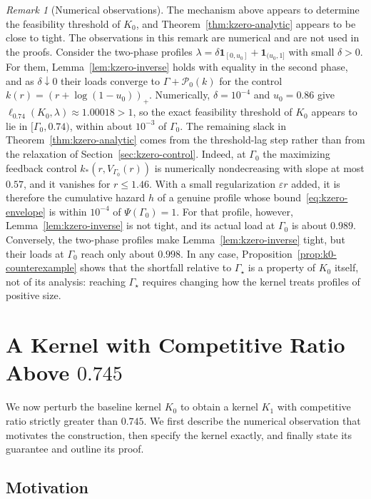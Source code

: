 \documentclass[11pt]{article}
\theoremstyle{definition}
\theoremstyle{remark}
\newtheorem*{remark}{Remark}
\newcommand{\ind}{\mathbf 1}
\newcommand{\pos}[1]{\left(#1\right)_+}
\begin{document}
\begin{remark}[Numerical observations]
The mechanism above appears to determine the feasibility threshold of $K_0$, and Theorem~\ref{thm:kzero-analytic} appears to be close to tight.
The observations in this remark are numerical and are not used in the proofs.
Consider the two-phase profiles $\lambda=\delta\ind_{[0,u_0]}+\ind_{(u_0,1]}$ with small $\delta>0$.
For them, Lemma~\ref{lem:kzero-inverse} holds with equality in the second phase, and as $\delta\downarrow0$ their loads converge to $\Gamma+\mathcal P_0(k)$ for the control $k(r)=\pos{r+\log(1-u_0)}$.
Numerically, $\delta=10^{-4}$ and $u_0=0.86$ give $\ell_{0.74}(K_0,\lambda)\approx1.00018>1$, so the exact feasibility threshold of $K_0$ appears to lie in $[\Gamma_0,0.74)$, within about $10^{-3}$ of $\Gamma_0$.
The remaining slack in Theorem~\ref{thm:kzero-analytic} comes from the threshold-lag step rather than from the relaxation of Section~\ref{sec:kzero-control}.
Indeed, at $\Gamma_0$ the maximizing feedback control $k_*(r,V_{\Gamma_0}(r))$ is numerically nondecreasing with slope at most $0.57$, and it vanishes for $r\le1.46$.
With a small regularization $\varepsilon r$ added, it is therefore the cumulative hazard $h$ of a genuine profile whose bound~\eqref{eq:kzero-envelope} is within $10^{-4}$ of $\Psi(\Gamma_0)=1$.
For that profile, however, Lemma~\ref{lem:kzero-inverse} is not tight, and its actual load at $\Gamma_0$ is about $0.989$.
Conversely, the two-phase profiles make Lemma~\ref{lem:kzero-inverse} tight, but their loads at $\Gamma_0$ reach only about $0.998$.
In any case, Proposition~\ref{prop:k0-counterexample} shows that the shortfall relative to $\Gamma_\star$ is a property of $K_0$ itself, not of its analysis: reaching $\Gamma_\star$ requires changing how the kernel treats profiles of positive size.
\end{remark}


\section{A Kernel with Competitive Ratio Above \texorpdfstring{$0.745$}{0.745}}
\label{sec:final-kernel}

We now perturb the baseline kernel $K_0$ to obtain a kernel $K_1$ with
competitive ratio strictly greater than $0.745$.
We first describe the numerical observation that motivates the construction,
then specify the kernel exactly, and finally state its guarantee
and outline its proof.

\subsection{Motivation}\label{sec:final-motivation}
\end{document}
